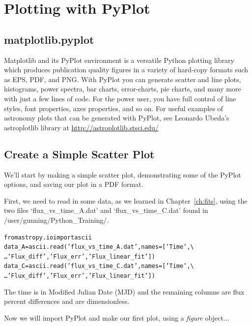 \chapter{Plotting with PyPlot}
\label{ch:pyplot}

\section{matplotlib.pyplot}
Matplotlib and its PyPlot environment is a versatile Python plotting
library which produces publication quality figures in a variety of
hard-copy formats such as EPS, PDF, and PNG.  With PyPlot you can
generate scatter and line plots, histograms, power spectra, bar
charts, error-charts, pie charts, and many more with just a few lines
of code. For the power user, you have full control of line styles,
font properties, axes properties, and so on. For useful examples of 
astronomy plots that can be generated with PyPlot, see Leonardo 
Ubeda's astroplotlib library at \href{http://astroplotlib.stsci.edu/}
{http://astroplotlib.stsci.edu/}


\section{Create a Simple Scatter Plot}

We'll start by making a simple scatter plot, demonstrating some of 
the PyPlot options, and saving our plot in a PDF format. 

First, we need to read in some data, as we learned in Chapter~\ref{ch:fits},
using the two files `flux\_vs\_time\_A.dat' and `flux\_vs\_time\_C.dat' found
in /user/gunning/Python\_Training/.

\begin{alltt}
\pytab from astropy.io import ascii
\pytab data_A = ascii.read('flux_vs_time_A.dat', names=['Time',  \textbackslash 
\ldots 'Flux_diff', 'Flux_err', 'Flux_linear_fit'])
\pytab data_C = ascii.read('flux_vs_time_C.dat', names=['Time',  \textbackslash 
\ldots 'Flux_diff', 'Flux_err', 'Flux_linear_fit'])
\end{alltt}

The time is in Modified Julian Date (MJD) and the remaining 
columns are flux percent differences and are dimensionless. 

Now we will import PyPlot and make our first plot, 
using a \textit{figure} object...

